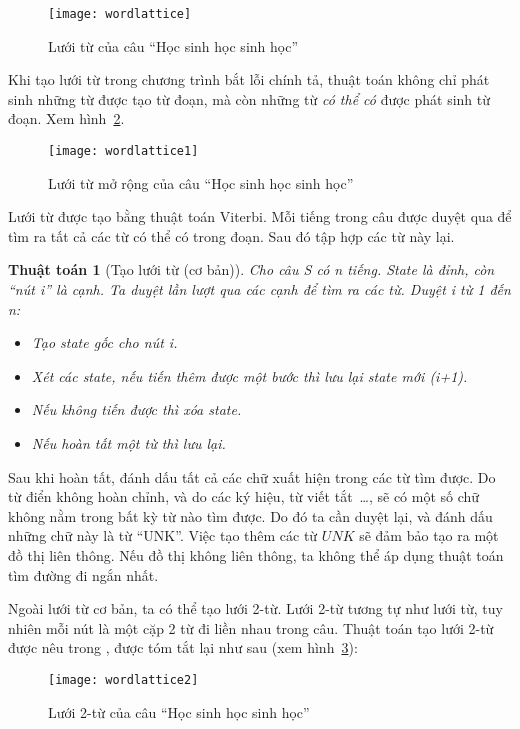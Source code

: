 \documentclass[a4paper,oneside]{book} %
\theoremstyle{break}
\newtheorem{algo}{Thuật toán}
\begin{document}
\begin{figure}[htbp]
  \centering
  \texttt{[image: wordlattice]}
  \caption{Lưới từ của câu ``Học sinh học sinh học''}
  \label{fig:wordlattice}
\end{figure}

Khi tạo lưới từ trong chương trình bắt lỗi chính tả, thuật toán không
chỉ phát sinh những từ được tạo từ đoạn, mà còn những từ {\em có thể
có} được phát sinh từ đoạn. Xem hình~\ref{fig:wordlattice1}.

\begin{figure}[htbp]
  \centering
  \texttt{[image: wordlattice1]}
  \caption{Lưới từ mở rộng của câu ``Học sinh học sinh học''}
  \label{fig:wordlattice1}
\end{figure}

Lưới từ được tạo bằng thuật toán Viterbi. Mỗi tiếng trong câu được
duyệt qua để tìm ra tất cả các từ có thể có trong đoạn. Sau đó tập hợp
các từ này lại. 

\begin{algo}[Tạo lưới từ (cơ bản)]
Cho câu S có n tiếng. State là đỉnh, còn ``nút i'' là cạnh. Ta duyệt
lần lượt qua các cạnh để tìm  ra các từ. Duyệt i từ 1 đến n:
\begin{itemize}
\item Tạo state gốc cho nút i.
\item Xét các state, nếu tiến thêm được một bước thì lưu lại state mới (i+1).
\item Nếu không tiến được thì xóa state.
\item Nếu hoàn tất một từ thì lưu lại.
\end{itemize}
\end{algo}

Sau khi hoàn tất, đánh dấu tất cả các chữ xuất hiện trong các từ tìm
được. Do từ điển không hoàn chỉnh, và do các ký hiệu, từ viết
tắt~\ldots{},
 sẽ có một số chữ không nằm trong bất kỳ từ nào tìm được. Do
đó ta cần duyệt lại, và đánh dấu những chữ này là từ ``UNK''. Việc tạo
thêm các từ $UNK$ sẽ đảm bảo tạo ra một đồ thị liên thông. Nếu đồ
thị không liên thông, ta không thể áp dụng thuật toán tìm đường đi
ngắn nhất.

Ngoài lưới từ cơ bản, ta có thể tạo lưới 2-từ. Lưới 2-từ
tương tự như lưới từ, tuy nhiên mỗi nút là một cặp 2 từ đi liền nhau
trong câu. Thuật toán tạo lưới 2-từ được nêu trong \cite{Ravishankar},
được tóm tắt lại như sau (xem hình~\ref{fig:wordlattice2}):

\begin{figure}[htbp]
  \centering
  \texttt{[image: wordlattice2]}
  \caption{Lưới 2-từ của câu ``Học sinh học sinh học''}
  \label{fig:wordlattice2}
\end{figure}
\end{document}
